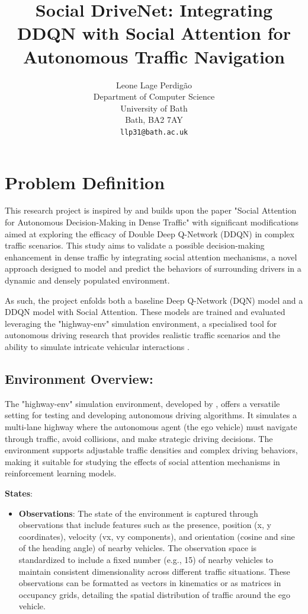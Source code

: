\documentclass{article}
\title{Social DriveNet: Integrating DDQN with Social Attention for Autonomous Traffic Navigation}
\author{
  Leone Lage Perdigão
  \\
  Department of Computer Science\\
  University of Bath\\
  Bath, BA2 7AY \\
  \texttt{llp31@bath.ac.uk} \\
}
\begin{document}
\maketitle

\section{Problem Definition}

This research project is inspired by and builds upon the paper "Social Attention for Autonomous Decision-Making in Dense Traffic" \citep{leurent2019social} with significant modifications aimed at exploring the efficacy of Double Deep Q-Network (DDQN) in complex traffic scenarios. This study aims to validate a possible decision-making enhancement in dense traffic by integrating social attention mechanisms, a novel approach designed to model and predict the behaviors of surrounding drivers in a dynamic and densely populated environment.

As such, the project enfolds both a baseline Deep Q-Network (DQN) model and a DDQN model with Social Attention. These models are trained and evaluated leveraging the "highway-env" simulation environment, a specialised tool for autonomous driving research that provides realistic traffic scenarios and the ability to simulate intricate vehicular interactions \citep{highway-env}.

\subsection{Environment Overview:}
The "highway-env" simulation environment, developed by \citet{highway-env}, offers a versatile setting for testing and developing autonomous driving algorithms. It simulates a multi-lane highway where the autonomous agent (the ego vehicle) must navigate through traffic, avoid collisions, and make strategic driving decisions. The environment supports adjustable traffic densities and complex driving behaviors, making it suitable for studying the effects of social attention mechanisms in reinforcement learning models.

\textbf{States}:
\begin{itemize}
  \item \textbf{Observations}: The state of the environment is captured through observations that include features such as the presence, position (x, y coordinates), velocity (vx, vy components), and orientation (cosine and sine of the heading angle) of nearby vehicles. The observation space is standardized to include a fixed number (e.g., 15) of nearby vehicles to maintain consistent dimensionality across different traffic situations. These observations can be formatted as vectors in kinematics or as matrices in occupancy grids, detailing the spatial distribution of traffic around the ego vehicle.
\end{itemize}
\end{document}
